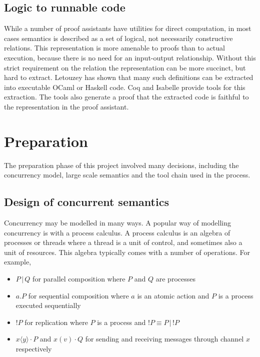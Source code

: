 \documentclass[12pt,twoside,notitlepage]{report}
\begin{document}
\section{Logic to runnable code}
While a number of proof assistants have utilities for direct computation, in most cases semantics is described as a set of logical, not necessarily constructive relations. This representation is more amenable to proofs than to actual execution, because there is no need for an input-output relationship. Without this strict requirement on the relation the representation can be more succinct, but hard to extract. Letouzey\cite{letouzey2008extraction} has shown that many such definitions can be extracted into executable OCaml or Haskell code.  Coq and Isabelle provide tools for this extraction. The tools also generate a proof that the extracted code is faithful to the representation in the proof assistant.


\chapter{Preparation}
The preparation phase of this project involved many decisions, including the concurrency model, large scale semantics and the tool chain used in the process.

\section{Design of concurrent semantics}
Concurrency may be modelled in many ways. A popular way of modelling concurrency is with a process calculus. A process calculus is an algebra of processes or threads where a thread is a unit of control, and sometimes also a unit of resources. This algebra typically comes with a number of operations.  For example, 
\begin{itemize}
\item{$ P\, | \, Q $  for parallel composition where $ P $ and $ Q $ are processes}
\item{ $ a.P  $ for sequential composition where $ a $ is an atomic action and $ P $ is a process executed sequentially}
\item{$ !P $ for replication where $ P $ is a process and $ !P \equiv P \, | \, !P $}
\item{$ x\langle y \rangle \cdot P $ and $ x(v) \cdot Q $ for sending and receiving messages through channel $ x $ respectively} 
\end{itemize}
\end{document}
